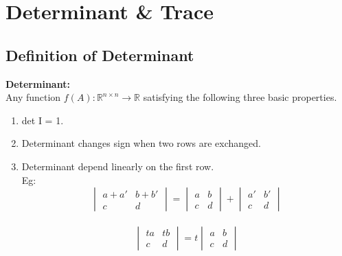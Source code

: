 \section{Determinant \& Trace}

\subsection{Definition of Determinant}
\begin{mdframed}[nobreak=true,backgroundcolor=gray!10,linecolor=Firebrick4]
\textbf{Determinant: }\\
Any function $f(A): \mathbb{R}^{n\times n} \to \mathbb{R}$ satisfying the following three basic properties.


\begin{enumerate}
\item det I = 1.
\item Determinant changes sign when two rows are exchanged.
\item Determinant depend linearly on the first row.\\
Eg: 
$$
\begin{vmatrix}
	a + a' & b + b'\\
	c & d	
\end{vmatrix}
=
\begin{vmatrix}
	a & b\\
	c & d	
\end{vmatrix}
+
\begin{vmatrix}
	a' & b'\\
	c & d	
\end{vmatrix}
$$\\

$$
\begin{vmatrix}
	ta & tb\\
	c & d
\end{vmatrix}
=
t
\begin{vmatrix}
	a & b\\
	c & d	
\end{vmatrix}
$$
 
\end{enumerate}

\end{mdframed}

